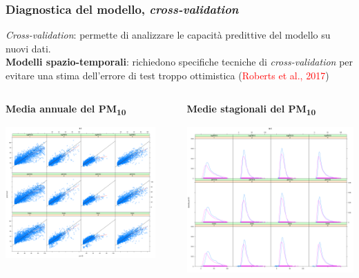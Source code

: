 \documentclass{beamer}
\begin{document}
\begin{frame}
\frametitle{Diagnostica del modello, \textit{cross-validation}}
{\footnotesize \textit{Cross-validation}: permette di analizzare le capacità predittive del modello su nuovi dati.\\
\vspace{\baselineskip}
\textbf{Modelli spazio-temporali}: richiedono specifiche tecniche di \textit{cross-validation} per evitare una stima dell'errore di 
test troppo ottimistica (\textcolor{red}{Roberts et al., 2017})\par}
\vspace{\baselineskip}
\begin{columns}
\begin{column}{0.5\textwidth}
{\small \centerline{\textbf{Media annuale del PM\textsubscript{10}}}}
\includegraphics[width=0.9\textwidth]{scatterplot.png}
\end{column}
\begin{column}{0.5\textwidth}
{\small \centerline{\textbf{Medie stagionali del PM\textsubscript{10}}}}
\includegraphics[height=0.9\textwidth]{density.png}
\end{column}
\end{columns}



\end{frame}
\end{document}
